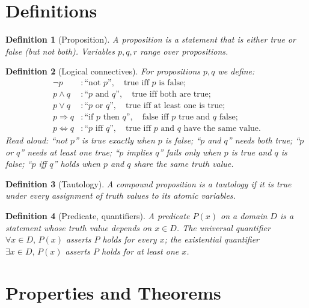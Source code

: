 \documentclass[11pt]{article}
\newtheorem{definition}{Definition}
\begin{document}
\section*{Definitions}

\begin{definition}[Proposition]
A \emph{proposition} is a statement that is either true or false (but not
both). Variables $p, q, r$ range over propositions.
\end{definition}

\begin{definition}[Logical connectives]
For propositions $p, q$ we define:
\begin{align*}
\neg p &: \text{``not } p\text{''}, \quad \text{true iff } p \text{ is false}; \\
p \land q &: \text{``}p \text{ and } q\text{''}, \quad \text{true iff both are true}; \\
p \lor q &: \text{``}p \text{ or } q\text{''}, \quad \text{true iff at least one is true}; \\
p \Rightarrow q &: \text{``if } p \text{ then } q\text{''}, \quad \text{false iff } p \text{ true and } q \text{ false}; \\
p \Leftrightarrow q &: \text{``}p \text{ iff } q\text{''}, \quad \text{true iff } p \text{ and } q \text{ have the same value}.
\end{align*}
\emph{Read aloud:} ``not $p$'' is true exactly when $p$ is false; ``$p$ and $q$''
needs both true; ``$p$ or $q$'' needs at least one true; ``$p$ implies $q$''
fails only when $p$ is true and $q$ is false; ``$p$ iff $q$'' holds when
$p$ and $q$ share the same truth value.
\end{definition}

\begin{definition}[Tautology]
A compound proposition is a \emph{tautology} if it is true under every
assignment of truth values to its atomic variables.
\end{definition}

\begin{definition}[Predicate, quantifiers]
A \emph{predicate} $P(x)$ on a domain $D$ is a statement whose truth value
depends on $x \in D$. The \emph{universal quantifier} $\forall x \in D,\, P(x)$
asserts $P$ holds for every $x$; the \emph{existential quantifier}
$\exists x \in D,\, P(x)$ asserts $P$ holds for at least one $x$.
\end{definition}

\section*{Properties and Theorems}
\end{document}
